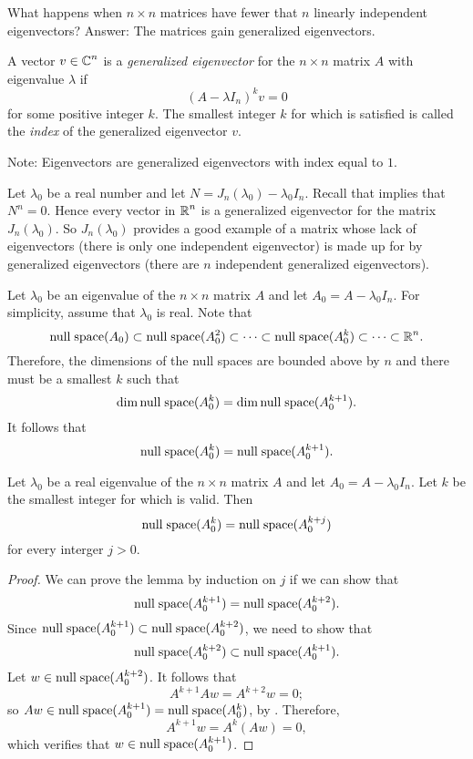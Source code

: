\documentclass{ximera}
\begin{document}
What happens when $n\times n$ matrices have fewer that $n$ linearly 
independent eigenvectors?  Answer: The matrices gain generalized 
eigenvectors.

\begin{Def}
A vector $v\in\mbox{$\Bbb{C}$}^n$ is a {\em generalized eigenvector\/} for the 
$n\times n$ matrix $A$ with eigenvalue $\lambda$ if
\begin{equation}  \label{e:geneig}
(A-\lambda I_n)^kv = 0
\end{equation}
for some positive integer $k$. The smallest integer $k$ for which
 is satisfied is called the {\em index\/}
 of the generalized eigenvector $v$.
\end{Def}  
Note: Eigenvectors are generalized eigenvectors with
index equal to $1$.

Let $\lambda_0$ be a real number and let $N=J_n(\lambda_0)-\lambda_0 I_n$.  
Recall that  implies that $N^n=0$.  Hence every vector in $\mbox{$\Bbb{R}$}^n$ 
is a generalized eigenvector for the matrix $J_n(\lambda_0)$.  So 
$J_n(\lambda_0)$ provides a good example of a matrix whose lack of 
eigenvectors (there is only one independent eigenvector) is made up for by 
generalized eigenvectors (there are $n$ independent generalized eigenvectors).

Let $\lambda_0$ be an eigenvalue of the $n\times n$ matrix $A$ and let 
$A_0 = A-\lambda_0 I_n$.  For simplicity, assume that $\lambda_0$ is real.
Note that 
\[
{\rm null\;space}(A_0)\subset{\rm null\;space}(A_0^2)\subset\cdots\subset{\rm null\;space}(A_0^k)\subset\cdots
\subset\mbox{$\Bbb{R}$}^n.
\]
Therefore, the dimensions of the null spaces are bounded above by $n$ and
there must be a smallest $k$ such that 
\[
\dim{\rm null\;space}(A_0^k)=\dim{\rm null\;space}(A_0^{k+1}).
\]
It follows that 
\begin{equation}  \label{E:nullsequal}
{\rm null\;space}(A_0^k)={\rm null\;space}(A_0^{k+1}).
\end{equation}
\begin{lemma}  \label{L:Jordan}
Let $\lambda_0$ be a real eigenvalue of the $n\times n$ matrix $A$ and let 
$A_0 = A-\lambda_0 I_n$.  Let $k$ be the smallest integer for which 
 is valid.  Then 
\[
{\rm null\;space}(A_0^k)={\rm null\;space}(A_0^{k+j})
\]
for every interger $j>0$.
\end{lemma}

\begin{proof} We can prove the lemma by induction on $j$ if we can show that 
\[
{\rm null\;space}(A_0^{k+1})={\rm null\;space}(A_0^{k+2}).
\]
Since ${\rm null\;space}(A_0^{k+1})\subset{\rm null\;space}(A_0^{k+2})$, we need to show that
\[
{\rm null\;space}(A_0^{k+2})\subset{\rm null\;space}(A_0^{k+1}).
\]
Let $w\in{\rm null\;space}(A_0^{k+2})$.  It follows that 
\[
A^{k+1}Aw = A^{k+2}w = 0;
\]
so $Aw\in{\rm null\;space}(A_0^{k+1})={\rm null\;space}(A_0^k)$, by .  Therefore,
\[
A^{k+1}w = A^k(Aw) = 0,
\]
which verifies that $w\in{\rm null\;space}(A_0^{k+1})$.  \end{proof}
\end{document}
